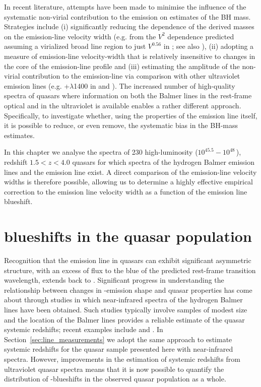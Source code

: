 In recent literature, attempts have been made to minimise the influence of the systematic non-virial contribution to the  emission on estimates of the BH mass. 
Strategies include (i) significantly reducing the dependence of the derived masses on the emission-line velocity width (e.g. from the $V^2$ dependence predicted assuming a virialized broad line region to just $V^{0.56}$ in \citealt{park13}; see also \citealt{shen12}), (ii) adopting a measure of emission-line velocity-width that is relatively insensitive to changes in the core of the emission-line profile \citep[e.g.][]{denney13} and (iii) estimating the amplitude of the non-virial contribution to the  emission-line via comparison with other ultraviolet emission lines (e.g. +$\lambda$1400 in \citealt{runnoe13} and \citealt{brotherton15}).
The increased number of high-quality spectra of quasars where information on both the Balmer lines in the rest-frame optical and  in the ultraviolet is available enables a rather different approach. 
Specifically, to investigate whether, using the properties of the  emission line itself, it is possible to reduce, or even remove, the systematic bias in the BH-mass estimates. 

In this chapter we analyse the spectra of 230 high-luminosity ($10^{45.5}-10^{48}$\,\ergs), redshift $1.5 < z < 4.0$ quasars for which spectra of the hydrogen Balmer emission lines and the  emission line exist. 
A direct comparison of the emission-line velocity widths is therefore possible, allowing us to determine a highly effective empirical correction to the  emission line velocity width as a function of the  emission line blueshift. 

\section{ blueshifts in the quasar population}
\label{sec:blueshifts}

Recognition that the  emission line in quasars can exhibit significant asymmetric structure, with an excess of flux to the blue of the predicted rest-frame transition wavelength, extends back to \citet{gaskell82}. 
Significant progress in understanding the relationship between changes in -emission shape and quasar properties has come about through studies in which near-infrared spectra of the hydrogen Balmer lines have been obtained. 
Such studies typically involve samples of modest size and the location of the Balmer lines provides a reliable estimate of the quasar systemic redshifts; recent examples include \citet{shen12} and \citet{marziani16}. 
In Section~\ref{sec:line_measurements} we adopt the same approach to estimate systemic redshifts for the quasar sample presented here with near-infrared spectra.  
However, improvements in the estimation of systemic redshifts from ultraviolet quasar spectra means that it is now possible to quantify the distribution of -blueshifts in the observed quasar population as a whole. 


